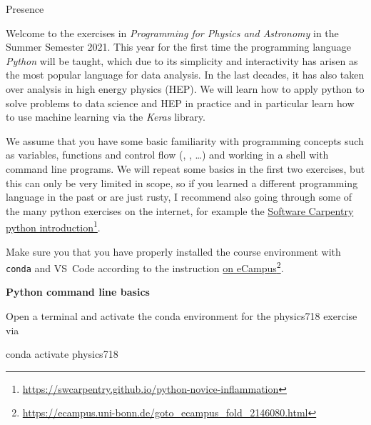 \documentclass[a4paper]{article}
\begin{document}


\begin{exam}[Presence]{Presence}
  \begin{instructions}[Introduction]

    Welcome to the exercises in \emph{Programming for Physics and Astronomy} in
    the Summer Semester 2021. This year for the first time the programming
    language \emph{Python} will be taught, which due to its simplicity and
    interactivity has arisen as the most popular language for data analysis. In
    the last decades, it has also taken over analysis in high energy physics (HEP). We
    will learn how to apply python to solve problems to data science and HEP in
    practice and in particular learn how to use machine learning via the
    \emph{Keras} library.

    We assume that you have some basic familiarity with programming concepts
    such as variables, functions and control flow (,
    , \ldots) and working in a shell with command line programs.
    We will repeat some basics in the first two exercises, but this can only be
    very limited in scope, so if you learned a different programming language in
    the past or are just rusty, I recommend also going through some of the many
    python exercises on the internet, for example the
    \href{https://swcarpentry.github.io/python-novice-inflammation}{Software
      Carpentry python introduction}\footnote{%
      \url{https://swcarpentry.github.io/python-novice-inflammation}}.
  \end{instructions}

  \begin{instructions}
   Make sure you that you have properly installed the course environment with
   \texttt{conda} and VS~Code according to the instruction
   \href{https://ecampus.uni-bonn.de/goto_ecampus_fold_2146080.html}{%
     on eCampus}\footnote{%
     \url{https://ecampus.uni-bonn.de/goto_ecampus_fold_2146080.html}}.

    \begin{problem*}\textbf{Python command line basics}

      Open a terminal and activate the conda environment for the physics718
      exercise via

      \begin{bashcode}
        conda activate physics718
      \end{bashcode}


\end{problem*}
\end{instructions}
\end{exam}
\end{document}
